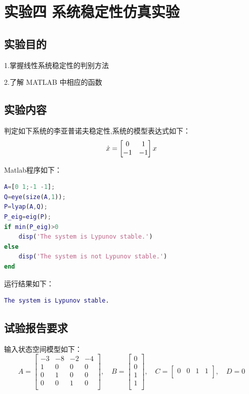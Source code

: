\documentclass[UTF8]{ctexart}
\begin{document}
		
\newpage
\section{实验四 \quad 系统稳定性仿真实验}
\subsection{ 实验目的 }
\par 1.掌握线性系统稳定性的判别方法
\par 2.了解 MATLAB 中相应的函数 
\subsection{实验内容 }
\par 判定如下系统的李亚普诺夫稳定性,系统的模型表达式如下：		
\begin{equation}
    \dot x\\=\begin{bmatrix}
    0 & 1 \\
    -1 & -1 \\ \end{bmatrix}x
\end{equation}		
		
\par Matlab程序如下：
\par  \begin{lstlisting}[language=matlab,escapeinside=``]	
A=[0 1;-1 -1];
Q=eye(size(A,1));
P=lyap(A,Q);
P_eig=eig(P);
if min(P_eig)>0
    disp('The system is Lypunov stable.')
else 
    disp('The system is not Lypunov stable.')
end
\end{lstlisting}
\par 运行结果如下：		
\par  \begin{lstlisting}[language=matlab,escapeinside=``]			
	The system is Lypunov stable.	
\end{lstlisting}		
		
\subsection{试验报告要求}
\par 输入状态空间模型如下：	
\begin{equation}
    A=\begin{bmatrix}
    -3 & -8 & -2 & -4\\
    1 & 0 & 0 & 0\\
    0 & 1 & 0 & 0\\
    0 & 0 & 1 & 0\\ \end{bmatrix}  , \quad B=\begin{bmatrix}
   0\\
   0\\
   1\\
   1\\ \end{bmatrix}   , \quad  C=\begin{bmatrix}
   0 & 0 & 1 & 1\\ \end{bmatrix}  , \quad D=0
\end{equation}	
	
\end{document}
